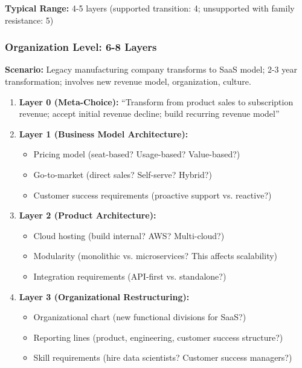 \documentclass[11pt, a4paper]{article}
\begin{document}
\begin{tcolorbox}[colback=gray!5!white, colframe=gray!75!black, title=Example: Major Life Transition (e.g., Career Pivot to New Field)]
\textbf{Typical Range:} 4-5 layers (supported transition: 4; unsupported with family resistance: 5)

\end{tcolorbox}

\subsubsection{Organization Level: 6-8 Layers}

\begin{tcolorbox}[colback=gray!5!white, colframe=gray!75!black, title=Example: Business Model Transformation (e.g., Hardware to Software-as-a-Service)]

\textbf{Scenario:} Legacy manufacturing company transforms to SaaS model; 2-3 year transformation; involves new revenue model, organization, culture.

\begin{enumerate}
    \item \textbf{Layer 0 (Meta-Choice):} ``Transform from product sales to subscription revenue; accept initial revenue decline; build recurring revenue model''

    \item \textbf{Layer 1 (Business Model Architecture):}
    \begin{itemize}[nosep]
        \item Pricing model (seat-based? Usage-based? Value-based?)
        \item Go-to-market (direct sales? Self-serve? Hybrid?)
        \item Customer success requirements (proactive support vs. reactive?)
    \end{itemize}

    \item \textbf{Layer 2 (Product Architecture):}
    \begin{itemize}[nosep]
        \item Cloud hosting (build internal? AWS? Multi-cloud?)
        \item Modularity (monolithic vs. microservices? This affects scalability)
        \item Integration requirements (API-first vs. standalone?)
    \end{itemize}

    \item \textbf{Layer 3 (Organizational Restructuring):}
    \begin{itemize}[nosep]
        \item Organizational chart (new functional divisions for SaaS?)
        \item Reporting lines (product, engineering, customer success structure?)
        \item Skill requirements (hire data scientists? Customer success managers?)
    \end{itemize}


\end{enumerate}
\end{tcolorbox}
\end{document}
